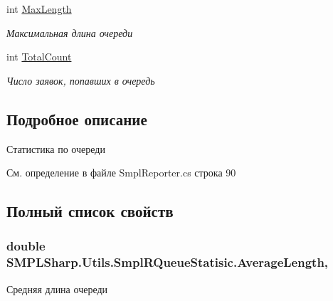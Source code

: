 \begin{DoxyCompactItemize}
int \hyperlink{class_s_m_p_l_sharp_1_1_utils_1_1_smpl_r_queue_statisic_af0c96a5114802513777f2d4cf5e176b9}{Max\-Length}
\begin{DoxyCompactList}\small\item\em Максимальная длина очереди \end{DoxyCompactList}\item 
int \hyperlink{class_s_m_p_l_sharp_1_1_utils_1_1_smpl_r_queue_statisic_aba57ab69353bec5cd8415a53bd6644fe}{Total\-Count}
\begin{DoxyCompactList}\small\item\em Число заявок, попавших в очередь \end{DoxyCompactList}\end{DoxyCompactItemize}


\subsection{Подробное описание}
Статистика по очереди 



См. определение в файле Smpl\-Reporter.\-cs строка 90



\subsection{Полный список свойств}
\hypertarget{class_s_m_p_l_sharp_1_1_utils_1_1_smpl_r_queue_statisic_aab2840b938ed22bd81799f7882cbc6e1}{
\subsubsection[{Average\-Length}]{\setlength{\rightskip}{0pt plus 5cm}double S\-M\-P\-L\-Sharp.\-Utils.\-Smpl\-R\-Queue\-Statisic.\-Average\-Length\hspace{0.3cm}{\ttfamily [get]}, {\ttfamily [set]}}}\label{de/de9/class_s_m_p_l_sharp_1_1_utils_1_1_smpl_r_queue_statisic_aab2840b938ed22bd81799f7882cbc6e1}


Средняя длина очереди 



